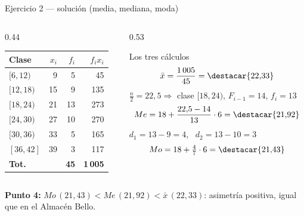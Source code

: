 \documentclass[aspectratio=169,10pt]{beamer}
\begin{document}
\begin{frame}{Ejercicio 2 — solución (media, mediana, moda)}
  \scriptsize
  \begin{columns}[T,onlytextwidth]
    \begin{column}{0.44\textwidth}
      \centering
      \begin{tabular}{@{}lrrr@{}}
        \toprule
        \textbf{Clase} & \textbf{$x_i$} & \textbf{$f_i$} &
        \textbf{$f_i x_i$} \\
        \midrule
        $[6,12)$  &  9 &  5 &   45 \\
        $[12,18)$ & 15 &  9 &  135 \\
        $[18,24)$ & 21 & 13 &  273 \\
        $[24,30)$ & 27 & 10 &  270 \\
        $[30,36)$ & 33 &  5 &  165 \\
        $[36,42]$ & 39 &  3 &  117 \\
        \midrule
        \textbf{Tot.} & & \textbf{45} & \textbf{1\,005} \\
        \bottomrule
      \end{tabular}
    \end{column}
    \begin{column}{0.53\textwidth}
      \begin{exampleblock}{Los tres cálculos}
        \scriptsize
        \[ \bar{x} = \frac{1\,005}{45} = \destacar{22{,}33} \]
        $\frac{n}{2} = 22{,}5 \Rightarrow$ clase $[18,24)$, $F_{i-1}=14$,
        $f_i=13$
        \[ Me = 18 + \frac{22{,}5-14}{13}\cdot 6 = \destacar{21{,}92} \]
        $d_1 = 13-9 = 4$, \ $d_2 = 13-10 = 3$
        \[ Mo = 18 + \tfrac{4}{7}\cdot 6 = \destacar{21{,}43} \]
      \end{exampleblock}
    \end{column}
  \end{columns}

  \vspace{0.05cm}
  {\tiny\color{uniGris} \textbf{Punto 4:} $Mo\,(21{,}43) < Me\,(21{,}92) <
  \bar{x}\,(22{,}33)$: asimetría positiva, igual que en el Almacén Bello.}
\end{frame}
\end{document}
